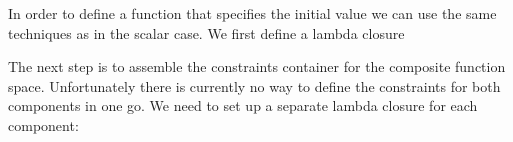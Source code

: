\documentclass[a4paper,12pt]{article}
\theoremstyle{definition}
\theoremstyle{definition}
\begin{document}
In order to define a function that specifies the initial value we can
use the same techniques as in the scalar case. We first define a lambda
closure
% 
% 

% 

% 

% 

The next step is to assemble the constraints container for the composite
function space. Unfortunately there is currently no way to define the
constraints for both components in one go. We need to
set up a separate lambda closure for each component:
% 
% 
\end{document}
